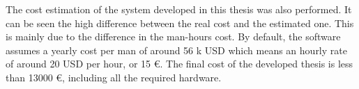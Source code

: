 		The cost estimation of the system developed in this thesis was also performed. 
		It can be seen the high difference between the real cost and the estimated one. 
		This is mainly due to the difference in the man-hours cost. 
		By default, the software assumes a yearly cost per man of around 56 k USD which means an hourly rate of around 20 USD per hour, or 15 \euro. 
		The final cost of the developed thesis is less than 13000 \euro, including all the required hardware. 
